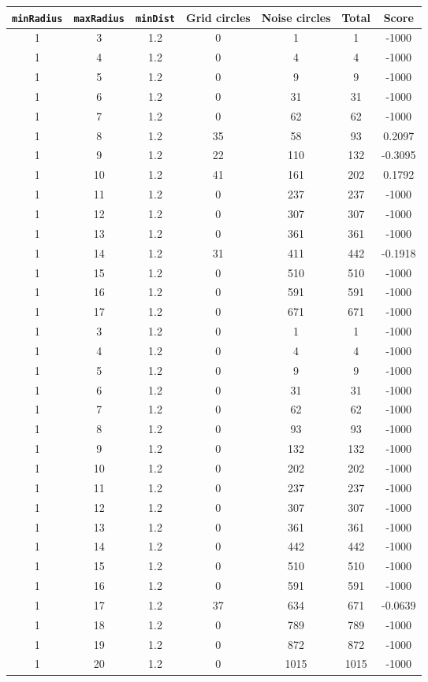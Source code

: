 \documentclass[letterpaper, 12pt]{article}
\begin{document}
\begin{longtable}{|c|c|c|c|c|c|c|}
\hline
\textbf{\texttt{minRadius}} & \textbf{\texttt{maxRadius}} & \textbf{\texttt{minDist}} & \textbf{Grid circles} & \textbf{Noise circles} & \textbf{Total} & \textbf{Score} \\
\hline
1 & 3 & 1.2 & 0 & 1 & 1 & -1000 \\
\hline
1 & 4 & 1.2 & 0 & 4 & 4 & -1000 \\
\hline
1 & 5 & 1.2 & 0 & 9 & 9 & -1000 \\
\hline
1 & 6 & 1.2 & 0 & 31 & 31 & -1000 \\
\hline
1 & 7 & 1.2 & 0 & 62 & 62 & -1000 \\
\hline
1 & 8 & 1.2 & 35 & 58 & 93 & 0.2097 \\
\hline
1 & 9 & 1.2 & 22 & 110 & 132 & -0.3095 \\
\hline
1 & 10 & 1.2 & 41 & 161 & 202 & 0.1792 \\
\hline
1 & 11 & 1.2 & 0 & 237 & 237 & -1000 \\
\hline
1 & 12 & 1.2 & 0 & 307 & 307 & -1000 \\
\hline
1 & 13 & 1.2 & 0 & 361 & 361 & -1000 \\
\hline
1 & 14 & 1.2 & 31 & 411 & 442 & -0.1918 \\
\hline
1 & 15 & 1.2 & 0 & 510 & 510 & -1000 \\
\hline
1 & 16 & 1.2 & 0 & 591 & 591 & -1000 \\
\hline
1 & 17 & 1.2 & 0 & 671 & 671 & -1000 \\
\hline
1 & 3 & 1.2 & 0 & 1 & 1 & -1000 \\
\hline
1 & 4 & 1.2 & 0 & 4 & 4 & -1000 \\
\hline
1 & 5 & 1.2 & 0 & 9 & 9 & -1000 \\
\hline
1 & 6 & 1.2 & 0 & 31 & 31 & -1000 \\
\hline
1 & 7 & 1.2 & 0 & 62 & 62 & -1000 \\
\hline
1 & 8 & 1.2 & 0 & 93 & 93 & -1000 \\
\hline
1 & 9 & 1.2 & 0 & 132 & 132 & -1000 \\
\hline
1 & 10 & 1.2 & 0 & 202 & 202 & -1000 \\
\hline
1 & 11 & 1.2 & 0 & 237 & 237 & -1000 \\
\hline
1 & 12 & 1.2 & 0 & 307 & 307 & -1000 \\
\hline
1 & 13 & 1.2 & 0 & 361 & 361 & -1000 \\
\hline
1 & 14 & 1.2 & 0 & 442 & 442 & -1000 \\
\hline
1 & 15 & 1.2 & 0 & 510 & 510 & -1000 \\
\hline
1 & 16 & 1.2 & 0 & 591 & 591 & -1000 \\
\hline
1 & 17 & 1.2 & 37 & 634 & 671 & -0.0639 \\
\hline
1 & 18 & 1.2 & 0 & 789 & 789 & -1000 \\
\hline
1 & 19 & 1.2 & 0 & 872 & 872 & -1000 \\
\hline
1 & 20 & 1.2 & 0 & 1015 & 1015 & -1000 \\
\hline
\end{longtable}
\end{document}
